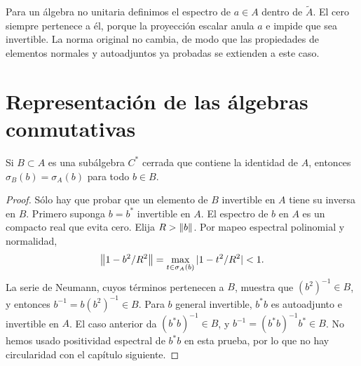 Para un álgebra no unitaria definimos el espectro de $a\in A$ dentro de $\widetilde A$. El cero siempre pertenece a él, porque la proyección escalar anula $a$ e impide que sea invertible. La norma original no cambia, de modo que las propiedades de elementos normales y autoadjuntos ya probadas se extienden a este caso.

\section{Representación de las álgebras conmutativas}

\begin{lema}\label{v3:permanencia-cstar}
Si $B\subset A$ es una subálgebra $C^*$ cerrada que contiene la identidad de $A$, entonces $\sigma_B(b)=\sigma_A(b)$ para todo $b\in B$.
\end{lema}
\begin{proof}
Sólo hay que probar que un elemento de $B$ invertible en $A$ tiene su inversa en $B$. Primero suponga $b=b^*$ invertible en $A$. El espectro de $b$ en $A$ es un compacto real que evita cero. Elija $R>\left\lVert b\right\rVert$. Por mapeo espectral polinomial y normalidad,
\[
 \left\lVert1-b^2/R^2\right\rVert
 =\max_{t\in\sigma_A(b)}|1-t^2/R^2|<1.
\]
La serie de Neumann, cuyos términos pertenecen a $B$, muestra que $(b^2)^{-1}\in B$, y entonces $b^{-1}=b(b^2)^{-1}\in B$. Para $b$ general invertible, $b^*b$ es autoadjunto e invertible en $A$. El caso anterior da $(b^*b)^{-1}\in B$, y $b^{-1}=(b^*b)^{-1}b^*\in B$. No hemos usado positividad espectral de $b^*b$ en esta prueba, por lo que no hay circularidad con el capítulo siguiente.
\end{proof}

